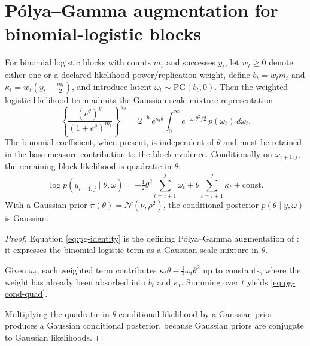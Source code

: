 \section{Pólya--Gamma augmentation for binomial-logistic blocks}
\begin{theorem}
\label{thm:pg}
For binomial logistic blocks with counts $m_t$ and successes $y_t$, let $w_t\ge 0$ denote either
one or a declared likelihood-power/replication weight, define
$b_t=w_t m_t$ and $\kappa_t=w_t(y_t-\tfrac{m_t}{2})$, and introduce latent
$\omega_t\sim\mathrm{PG}(b_t,0)$. Then the weighted logistic likelihood term admits the Gaussian
scale-mixture representation
\begin{equation}
\left\{\frac{(e^\theta)^{y_t}}{(1+e^\theta)^{m_t}}\right\}^{w_t}
 = 2^{-b_t} e^{\kappa_t\theta}
   \int_0^\infty e^{-\omega_t\theta^2/2}\,p(\omega_t)\,d\omega_t.
\label{eq:pg-identity}
\end{equation}
The binomial coefficient, when present, is independent of $\theta$ and must be retained in the base-measure contribution to the block evidence. Conditionally on $\omega_{i+1:j}$, the remaining block likelihood is quadratic in $\theta$:
\begin{equation}
\log p(y_{i+1:j}\mid \theta,\omega)
 =
 -\tfrac{1}{2}\theta^2 \sum_{t=i+1}^j \omega_t
 + \theta \sum_{t=i+1}^j \kappa_t
 + \mathrm{const}.
\label{eq:pg-cond-quad}
\end{equation}
With a Gaussian prior $\pi(\theta)=\mathcal{N}(\nu,\rho^2)$, the conditional posterior
$p(\theta\mid y,\omega)$ is Gaussian.
\end{theorem}

\begin{proof}
Equation \eqref{eq:pg-identity} is the defining P\'olya--Gamma augmentation of
\citet{polson2013pg}: it expresses the binomial-logistic term as a Gaussian scale mixture in
$\theta$.

Given $\omega_t$, each weighted term contributes $\kappa_t\theta-\tfrac12\omega_t\theta^2$ up to
constants, where the weight has already been absorbed into $b_t$ and $\kappa_t$. Summing over $t$
yields \eqref{eq:pg-cond-quad}.

Multiplying the quadratic-in-$\theta$ conditional likelihood by a Gaussian prior produces a
Gaussian conditional posterior, because Gaussian priors are conjugate to Gaussian likelihoods.
\end{proof}


